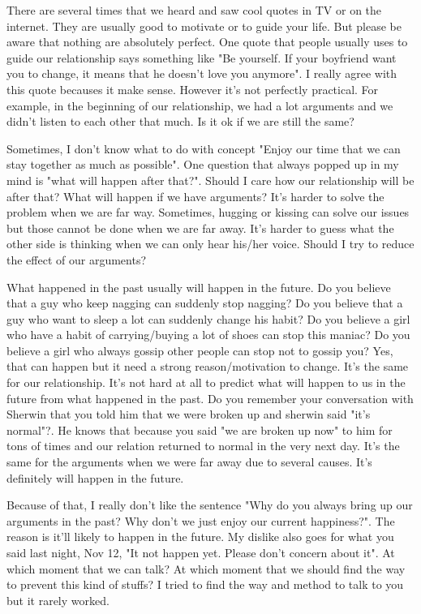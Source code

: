 
There are several times that we heard and saw cool quotes in TV or on the internet. They are usually good to motivate or to guide your life. But please be aware that nothing are absolutely perfect. One quote that people usually uses to guide our relationship says something like "Be yourself. If your boyfriend want you to change, it means that he doesn't love you anymore". I really agree with this quote becauses it make sense. However it's not perfectly practical. For example, in the beginning of our relationship, we had a lot arguments and we didn't listen to each other that much. Is it ok if we are still the same?

Sometimes, I don't know what to do with concept "Enjoy our time that we can stay together as much as possible". One question that always popped up in my mind is "what will happen after that?". Should I care how our relationship will be after that? What will happen if we have arguments? It's harder to solve the problem when we are far way. Sometimes, hugging or kissing can solve our issues but those cannot be done when we are far away. It's harder to guess what the other side is thinking when we can only hear his/her voice. Should I try to reduce the effect of our arguments? 

What happened in the past usually will happen in the future. Do you believe that a guy who keep nagging can suddenly stop nagging? Do you believe that a guy who want to sleep a lot can suddenly change his habit? Do you believe a girl who have a habit of carrying/buying a lot of shoes can stop this maniac? Do you believe a girl who always gossip other people can stop not to gossip you? Yes, that can happen but it need a strong reason/motivation to change. It's the same for our relationship. It's not hard at all to predict what will happen to us in the future from what happened in the past. Do you remember your conversation with Sherwin that you told him that we were broken up and sherwin said "it's normal"?. He knows that because you said "we are broken up now" to him for tons of times and our relation returned to normal in the very next day. It's the same for the arguments when we were far away due to several causes. It's definitely will happen in the future.

Because of that, I really don't like the sentence "Why do you always bring up our arguments in the past? Why don't we just enjoy our current happiness?". The reason is it'll likely to happen in the future. My dislike also goes for what you said last night, Nov 12, "It not happen yet. Please don't concern about it". At which moment that we can talk? At which moment that we should find the way to prevent this kind of stuffs? I tried to find the way and method to talk to you but it rarely worked.

